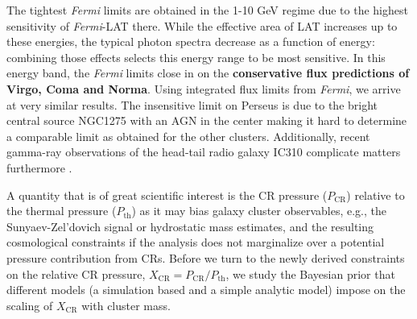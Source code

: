 \documentclass[10pt,aps,pra,reprint,amsmath,amsfonts,amssymb,showpacs,nofootinbib,floatfix]{revtex4-1}
\def\del#1{{}}
\def\C#1{{\bf #1}}
\newcommand{\Fermi}{{\em Fermi}\xspace}
\newcommand{\rmn}{\mathrm}
\newcommand{\CR}{\rmn{CR}}
\begin{document}
The tightest \Fermi limits are obtained in the 1-10 GeV
regime due to the highest sensitivity of \Fermi-LAT there. While the
effective area of LAT increases up to these energies, the typical
photon spectra decrease as a function of energy: combining those
effects selects this energy range to be most sensitive.  In this
energy band, the \Fermi limits close in on the \C{conservative flux
  predictions of Virgo, Coma and Norma}. Using integrated flux limits
  from \Fermi, we arrive at very similar results.  \del{We emphasize that
  by using our analytic modeling, the slight discrepancy of the
  scaling relation-based prediction with the \Fermi limit on Norma
  \cite{2010ApJ...717L..71A} is resolved: Norma simply seems to be
  less bright than an average cluster of the same mass as Norma.} The
  insensitive limit on Perseus is due to the bright central source
  NGC1275 with an AGN in the center \cite{2010ATel.2916....1M} making
  it hard to determine a comparable limit as obtained for the other
  clusters. Additionally, recent gamma-ray observations of
  the head-tail radio galaxy IC310 complicate matters furthermore
  \cite{2010ApJ...723L.207A,2010A&A...519L...6N}.

A quantity that is of great scientific interest is the CR pressure
($P_\CR$) relative to the thermal pressure ($P_\rmn{th}$) as it may
bias galaxy cluster observables, e.g., the Sunyaev-Zel’dovich signal
or hydrostatic mass estimates, and the resulting cosmological
constraints if the analysis does not marginalize over a potential
pressure contribution from CRs. Before we turn to the newly derived
constraints on the relative CR pressure, $X_\CR = P_\CR/P_\rmn{th}$,
we study the Bayesian prior that different models (a simulation based
and a simple analytic model) impose on the scaling of $X_\CR$ with
cluster mass.
\end{document}
